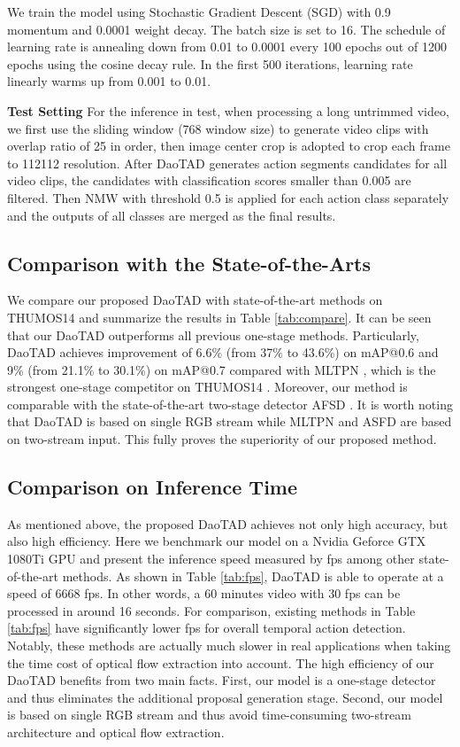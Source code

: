\documentclass[final]{cvpr}
\begin{document}
We train the model using Stochastic Gradient Descent (SGD) with 0.9 momentum and 0.0001 weight decay. The batch size is set to 16. The schedule of learning rate is annealing down from 0.01 to 0.0001 every 100 epochs out of 1200 epochs using the cosine decay rule. In the first 500 iterations, learning rate linearly warms up from 0.001 to 0.01.

\textbf{Test Setting}
For the inference in test, when processing a long untrimmed video, we first use the sliding window (768 window size) to generate video clips with overlap ratio of 25 in order, then image center crop is adopted to crop each frame to 112112 resolution. After DaoTAD generates action segments candidates for all video clips, the candidates with classification scores smaller than 0.005 are filtered. Then NMW \cite{ning2017inception} with threshold 0.5 is applied for each action class separately and the outputs of all classes are merged as the final results.

\subsection{Comparison with the State-of-the-Arts}
We compare our proposed DaoTAD with state-of-the-art methods on THUMOS14 \cite{jiang2014thumos} and summarize the results in Table \ref{tab:compare}. It can be seen that our DaoTAD outperforms all previous one-stage methods. Particularly, DaoTAD achieves improvement of 6.6\% (from 37\% to 43.6\%) on mAP@0.6 and 9\% (from 21.1\% to 30.1\%) on mAP@0.7 compared with MLTPN \cite{wang2020multi}, which is the strongest one-stage competitor on THUMOS14 \cite{jiang2014thumos}. Moreover, our method is comparable with the state-of-the-art two-stage detector AFSD \cite{lin2021learning}. It is worth noting that DaoTAD is based on single RGB stream while MLTPN \cite{wang2020multi} and ASFD \cite{lin2021learning} are based on two-stream input. This fully proves the superiority of our proposed method.

\subsection{Comparison on Inference Time}
As mentioned above, the proposed DaoTAD achieves not only high accuracy, but also high efficiency. Here we benchmark our model on a Nvidia Geforce GTX 1080Ti GPU and present the inference speed measured by fps among other state-of-the-art methods. As shown in Table \ref{tab:fps}, DaoTAD is able to operate at a speed of 6668 fps. In other words, a 60 minutes video with 30 fps can be processed in around 16 seconds. For comparison, existing methods in Table \ref{tab:fps} have significantly lower fps for overall temporal action detection. Notably, these methods are actually much slower in real applications when taking the time cost of optical flow extraction into account. The high efficiency of our DaoTAD benefits from two main facts. First, our model is a one-stage detector and thus eliminates the additional proposal generation stage. Second, our model is based on single RGB stream and thus avoid time-consuming two-stream architecture and optical flow extraction. 
\end{document}
